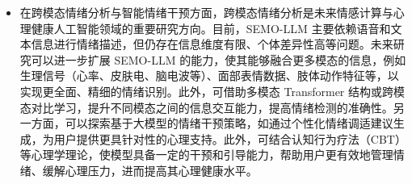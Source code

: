 \begin{itemize}
  \item 在跨模态情绪分析与智能情绪干预方面，跨模态情绪分析是未来情感计算与心理健康人工智能领域的重要研究方向。目前，SEMO-LLM 主要依赖语音和文本信息进行情绪描述，但仍存在信息维度有限、个体差异性高等问题。未来研究可以进一步扩展 SEMO-LLM 的能力，使其能够融合更多模态的信息，例如生理信号（心率、皮肤电、脑电波等）、面部表情数据、肢体动作特征等，以实现更全面、精细的情绪识别。此外，可借助多模态 Transformer 结构或跨模态对比学习，提升不同模态之间的信息交互能力，提高情绪检测的准确性。另一方面，可以探索基于大模型的情绪干预策略，如通过个性化情绪调适建议生成，为用户提供更具针对性的心理支持。此外，可结合认知行为疗法（CBT）等心理学理论，使模型具备一定的干预和引导能力，帮助用户更有效地管理情绪、缓解心理压力，进而提高其心理健康水平。
\end{itemize}
